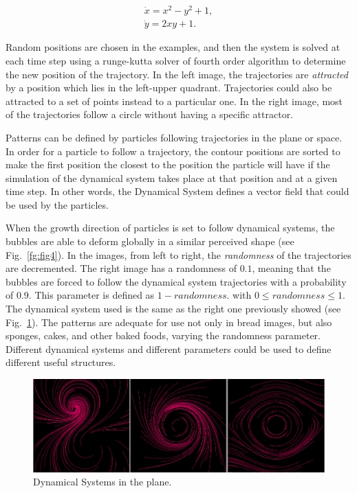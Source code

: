 \documentclass[oneside,a4paper,english,links]{amca}
\begin{document}
\begin{equation} \label{eq:simple}  
\begin{aligned}
\dot{x} = x^{2}-y^{2}+1,\\
\dot{y} = 2xy+1.
\end{aligned}
\end{equation}

Random positions are chosen in the examples, and then the system is solved at each time step using a runge-kutta solver of fourth order\citep{aa} algorithm to determine the new position of the trajectory. In the left image, the trajectories are {\em attracted} by a position which lies in the left-upper quadrant. Trajectories could also be attracted to a set of points instead to a particular one. In the right image, most of the trajectories follow a circle without having a specific attractor.

Patterns can be defined by particles following trajectories in the plane or space. In order for a particle to follow a trajectory, the contour positions are sorted to make the first position the closest to the position the particle will have if the simulation of the dynamical system takes place at that position and at a given time step. In other words, the Dynamical System defines a vector field that could be used by the particles.

When the growth direction of particles is set to follow dynamical systems, the bubbles are able to deform globally in a similar perceived shape (see Fig.~\ref{fg:fig4}). In the images, from left to right, the {\em randomness} of the trajectories are decremented. The right image has a randomness of $0.1$, meaning that the bubbles are forced to follow the dynamical system trajectories with a probability of 0.9. This parameter is defined as $1-randomness$. with $0 \leq randomness \leq 1$. The dynamical system used is the same as the right one previously showed (see Fig.~\ref{fg:fig3}).
The patterns are adequate for use not only in bread images, but also sponges, cakes, and other baked foods, varying the randomness parameter. Different dynamical systems and different parameters could be used to define different useful structures.

\begin{figure}[htb!]
\centerline{\includegraphics[scale=0.28]{fig3}}
\caption{Dynamical Systems in the plane.}
\label{fg:fig3}
\end{figure}
\end{document}
